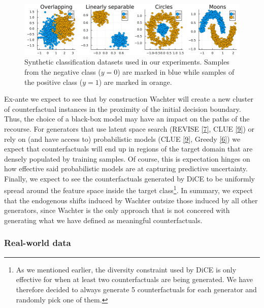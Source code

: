 \documentclass[conference,final,]{IEEEtran}
\theoremstyle{definition}
\theoremstyle{definition}
\theoremstyle{definition}
\theoremstyle{definition}
\theoremstyle{remark}
\begin{document}
\begin{figure}

{\centering \includegraphics[width=0.9\linewidth]{www/synthetic_data} 

}

\caption{Synthetic classification datasets used in our experiments. Samples from the negative class ($y=0$) are marked in blue while samples of the positive class ($y=1$) are marked in orange.}\label{fig:synthetic-data}
\end{figure}

Ex-ante we expect to see that by construction Wachter will create a new cluster of counterfactual instances in the proximity of the initial decision boundary. Thus, the choice of a black-box model may have an impact on the paths of the recourse. For generators that use latent space search (REVISE \protect\hyperlink{ref-joshi2019towards}{{[}7{]}}, CLUE \protect\hyperlink{ref-antoran2020getting}{{[}9{]}}) or rely on (and have access to) probabilistic models (CLUE \protect\hyperlink{ref-antoran2020getting}{{[}9{]}}, Greedy \protect\hyperlink{ref-schut2021generating}{{[}6{]}}) we expect that counterfactuals will end up in regions of the target domain that are densely populated by training samples. Of course, this is expectation hinges on how effective said probabilistic models are at capturing predictive uncertainty. Finally, we expect to see the counterfactuals generated by DiCE to be uniformly spread around the feature space inside the target class\footnote{As we mentioned earlier, the diversity constraint used by DiCE is only effective for when at least two counterfactuals are being generated. We have therefore decided to always generate 5 counterfactuals for each generator and randomly pick one of them.}. In summary, we expect that the endogenous shifts induced by Wachter outsize those induced by all other generators, since Wachter is the only approach that is not concered with generating what we have defined as meaningful counterfactuals.

\hypertarget{real-world-data}{%
\subsubsection{Real-world data}\label{real-world-data}}
\end{document}
